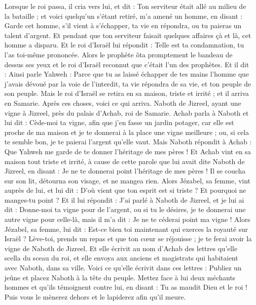 \begin{multicols}{2}
Lorsque le roi passa, il cria vers lui, et dit : Ton serviteur était allé au milieu de la bataille ; et voici quelqu'un s'étant retiré, m'a amené un homme, en disant : Garde cet homme, s'il vient à s'échapper, ta vie en répondra, ou tu paieras un talent d'argent.
Et pendant que ton serviteur faisait quelques affaires çà et là, cet homme a disparu. Et le roi d'Israël lui répondit : Telle est ta condamnation, tu l’as toi-même prononcée.
Alors le prophète ôta promptement le bandeau de dessus ses yeux et le roi d'Israël reconnut que c'était l’un des prophètes.
Et il dit : Ainsi parle Yahweh : Parce que tu as laissé échapper de tes mains l'homme que j'avais dévoué par la voie de l'interdit, ta vie répondra de sa vie, et ton peuple de son peuple.
Mais le roi d'Israël se retira en sa maison, triste et irrité ; et il arriva en Samarie.
\VerseOne{}Après ces choses, voici ce qui arriva. Naboth de Jizreel, ayant une vigne à Jizreel, près du palais d'Achab, roi de Samarie.
Achab parla à Naboth et lui dit : Cède-moi ta vigne, afin que j'en fasse un jardin potager, car elle est proche de ma maison et je te donnerai à la place une vigne meilleure ; ou, si cela te semble bon, je te paierai l'argent qu'elle vaut.
Mais Naboth répondit à Achab : Que Yahweh me garde de te donner l'héritage de mes pères !
Et Achab vint en sa maison tout triste et irrité, à cause de cette parole que lui avait dite Naboth de Jizreel, en disant : Je ne te donnerai point l'héritage de mes pères ! Il se coucha sur son lit, détourna son visage, et ne mangea rien.
Alors Jézabel, sa femme, vint auprès de lui, et lui dit : D'où vient que ton esprit est si triste ? Et pourquoi ne manges-tu point ?
Et il lui répondit : J’ai parlé à Naboth de Jizreel, et je lui ai dit : Donne-moi ta vigne pour de l'argent, ou si tu le désires, je te donnerai une autre vigne pour celle-là, mais il m'a dit : Je ne te céderai point ma vigne !
Alors Jézabel, sa femme, lui dit : Est-ce bien toi maintenant qui exerces la royauté sur Israël ? Lève-toi, prends un repas et que ton cœur se réjouisse ; je te ferai avoir la vigne de Naboth de Jizreel.
Et elle écrivit au nom d'Achab des lettres qu’elle scella du sceau du roi, et elle envoya aux anciens et magistrats qui habitaient avec Naboth, dans sa ville.
Voici ce qu’elle écrivit dans ces lettres : Publiez un jeûne et placez Naboth à la tête du peuple.
Mettez face à lui deux méchants hommes et qu'ils témoignent contre lui, en disant : Tu as maudit Dieu et le roi ! Puis vous le mènerez dehors et le lapiderez afin qu'il meure.

\end{multicols}
